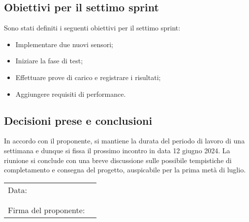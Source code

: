 \documentclass[italian,12pt]{article}
\begin{document}
\subsection{Obiettivi per il settimo sprint}
Sono stati definiti i seguenti obiettivi per il settimo sprint:
\begin{itemize}
	\item Implementare due nuovi sensori;
	\item Iniziare la fase di test;
	\item Effettuare prove di carico e registrare i risultati;
	\item Aggiungere requisiti di performance.
\end{itemize}

\subsection{Decisioni prese e conclusioni}
In accordo con il proponente, si mantiene la durata del periodo di lavoro di una settimana e dunque si fissa il prossimo incontro in data
12 giugno 2024. La riunione si conclude con una breve discussione sulle possibile tempistiche di completamento e consegna del progetto,
auspicabile per la prima metà di luglio.

\begin{table}[b]
	\begin{tabular}{@{}p{5cm}p{10cm}@{}}
		Data:  & \hrulefill \\
		       &            \\
		       &            \\
		Firma del proponente: & \hrulefill \\
	\end{tabular}
\end{table}
\end{document}
